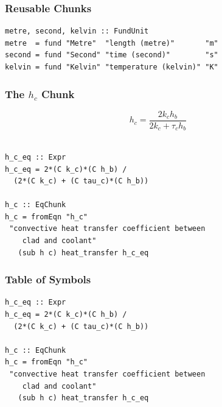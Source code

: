 \documentclass{beamer}
\begin{document}

\begin{frame}[fragile]

\frametitle{Reusable Chunks}

\begin{lstlisting}[frame=none, showstringspaces=false, 
  basicstyle=\small]
metre, second, kelvin :: FundUnit
metre  = fund "Metre"  "length (metre)"       "m"
second = fund "Second" "time (second)"        "s"
kelvin = fund "Kelvin" "temperature (kelvin)" "K"
\end{lstlisting}

\end{frame}


\begin{frame}[fragile]

\frametitle{The $h_c$ Chunk}

$$h_{c} = \frac{2k_{c} h_{b}}{2k_{c}+\tau_{c}h_{b}}$$
~\newline

\begin{lstlisting}[frame=none, showstringspaces=false, basicstyle=\small]
h_c_eq :: Expr
h_c_eq = 2*(C k_c)*(C h_b) /
  (2*(C k_c) + (C tau_c)*(C h_b))

h_c :: EqChunk
h_c = fromEqn "h_c" 
 "convective heat transfer coefficient between 
    clad and coolant"
   (sub h c) heat_transfer h_c_eq

\end{lstlisting}

\end{frame}


\begin{frame}[fragile]

\frametitle{Table of Symbols}

\begin{lstlisting}[frame=none, showstringspaces=false, basicstyle=\small]
h_c_eq :: Expr
h_c_eq = 2*(C k_c)*(C h_b) /
  (2*(C k_c) + (C tau_c)*(C h_b))

h_c :: EqChunk
h_c = fromEqn "h_c" 
 "convective heat transfer coefficient between 
    clad and coolant"
   (sub h c) heat_transfer h_c_eq

\end{lstlisting}

\end{frame}
\end{document}
